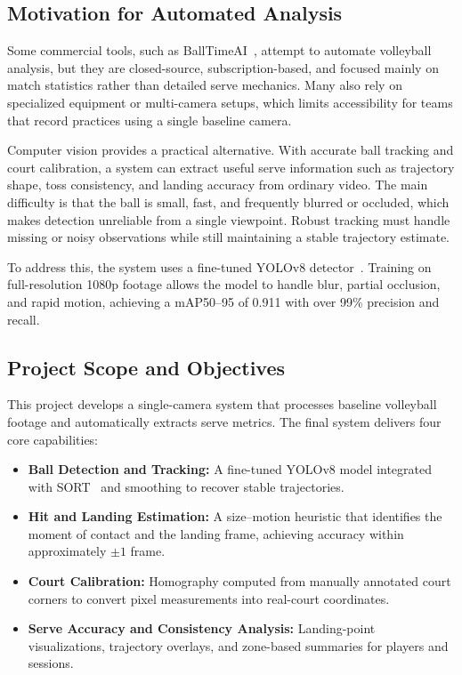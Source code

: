 \subsection{Motivation for Automated Analysis}
Some commercial tools, such as BallTimeAI~\cite{balltime}, attempt to automate volleyball analysis, but they are closed-source, subscription-based, and focused mainly on match statistics rather than detailed serve mechanics. Many also rely on specialized equipment or multi-camera setups, which limits accessibility for teams that record practices using a single baseline camera.

Computer vision provides a practical alternative. With accurate ball tracking and court calibration, a system can extract useful serve information such as trajectory shape, toss consistency, and landing accuracy from ordinary video. The main difficulty is that the ball is small, fast, and frequently blurred or occluded, which makes detection unreliable from a single viewpoint. Robust tracking must handle missing or noisy observations while still maintaining a stable trajectory estimate.

To address this, the system uses a fine-tuned YOLOv8 detector~\cite{yolov8}. Training on full-resolution 1080p footage allows the model to handle blur, partial occlusion, and rapid motion, achieving a mAP50--95 of 0.911 with over 99\% precision and recall.

\subsection{Project Scope and Objectives}
This project develops a single-camera system that processes baseline volleyball footage and automatically extracts serve metrics. The final system delivers four core capabilities:
\begin{itemize}
    \item \textbf{Ball Detection and Tracking:} A fine-tuned YOLOv8 model integrated with SORT~\cite{sort} and smoothing to recover stable trajectories.
    \item \textbf{Hit and Landing Estimation:} A size--motion heuristic that identifies the moment of contact and the landing frame, achieving accuracy within approximately $\pm 1$ frame.
    \item \textbf{Court Calibration:} Homography computed from manually annotated court corners to convert pixel measurements into real-court coordinates.
    \item \textbf{Serve Accuracy and Consistency Analysis:} Landing-point visualizations, trajectory overlays, and zone-based summaries for players and sessions.
\end{itemize}

